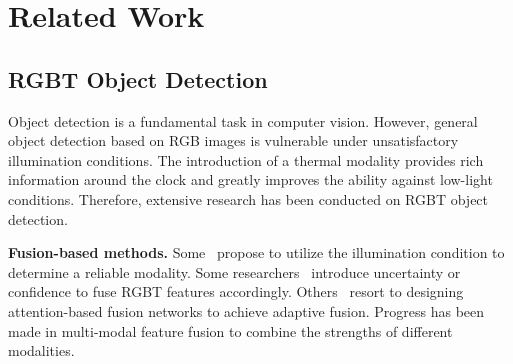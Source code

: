 \section{Related Work}
\label{sec:related}
\subsection{RGBT Object Detection}
Object detection is a fundamental task in computer vision. However, general object detection based on RGB images is vulnerable under unsatisfactory illumination conditions. The introduction of a thermal modality provides rich information around the clock and greatly improves the ability against low-light conditions. Therefore, extensive research has been conducted on RGBT object detection. 

\textbf{Fusion-based methods.} Some~\cite{iafrcnn,guan2019fusion,zhang2023tinet} propose to utilize the illumination condition to determine a reliable modality. Some researchers~\cite{kim2021uncertainty,sun2022drone,li2023multiscale} introduce uncertainty or confidence to fuse RGBT features accordingly. Others~\cite{zhang2019cross,zhou2020improving,shen2024icafusion,yuan2024c} resort to designing attention-based fusion networks to achieve adaptive fusion. Progress has been made in multi-modal feature fusion to combine the strengths of different modalities.


